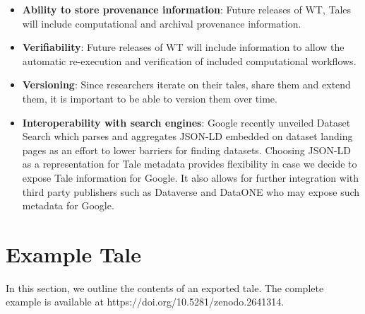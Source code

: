 \documentclass[conference]{IEEEtran}
\begin{document}
\begin{itemize}
\item{{\bf Ability to store provenance information}: Future releases of WT, Tales will include computational and archival provenance information.}
\item{{\bf Verifiability}: Future releases of WT will include information to allow the automatic re-execution and verification of included computational workflows.}
\item{{\bf Versioning}: Since researchers iterate on their tales, share them and extend them, it is important to be able to version them over time.}
\item{{\bf Interoperability with search engines}: Google recently unveiled Dataset Search which parses and aggregates JSON-LD embedded on dataset landing pages as an effort to lower barriers for finding datasets. Choosing JSON-LD as a representation for Tale metadata provides flexibility in case we decide to expose Tale information for Google. It also allows for further integration with third party publishers such as Dataverse and DataONE who may expose such metadata for Google.}
\end{itemize}

\section{Example Tale}

In this section, we outline the contents of an exported tale. The complete example is available at https://doi.org/10.5281/zenodo.2641314.
\end{document}

